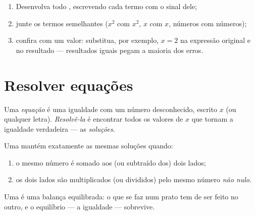 \begin{method}\label{met:g8:equations:reduce}
\begin{enumerate}
  \item Desenvolva todo , escrevendo cada termo com o sinal
        dele;
  \item junte os termos semelhantes ($x^2$ com $x^2$, $x$ com $x$,
        números com números);
  \item confira com um valor: substitua, por exemplo, $x = 2$ na
        expressão original e no resultado --- resultados iguais pegam a
        maioria dos erros.
\end{enumerate}
\end{method}

\section{Resolver equações}

\begin{definition}[Equação]\label{def:g8:equations:def}
Uma \emph{equação} é uma igualdade com um número
desconhecido, escrito $x$ (ou qualquer letra). \emph{Resolvê-la} é
encontrar todos os valores de $x$ que tornam a igualdade verdadeira ---
as \emph{soluções}.
\end{definition}

\begin{theorem}\label{thm:g8:equations:balance}
Uma  mantém exatamente as mesmas soluções quando:
\begin{enumerate}
  \item o mesmo número é somado aos (ou subtraído dos) dois lados;
  \item os dois lados são multiplicados (ou divididos) pelo mesmo
        número \emph{não nulo}.
\end{enumerate}
\end{theorem}
\admitted

\begin{omfigure}

{\small Uma  é uma balança equilibrada: o que se faz num prato
tem de ser feito no outro, e o equilíbrio --- a igualdade ---
sobrevive.}
\end{omfigure}

